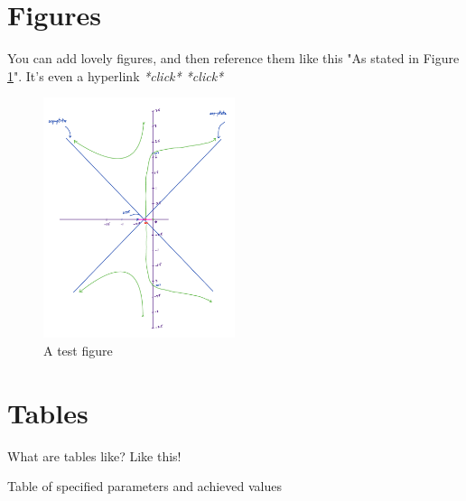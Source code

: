 \documentclass[hidelinks, 12pt]{article}%
\begin{document}
    \clearpage
    \section{Figures}
        You can add lovely figures, and then reference them like this "As stated in Figure \ref{fig:test}".
        It's even a hyperlink \textit{*click* *click*}

        \begin{figure}[H]
            \begin{centering}
                \includegraphics[width=0.5\textwidth]{images/rootLocus.png}
                \caption{A test figure}
                \label{fig:test}
            \end{centering}
        \end{figure}

    \section{Tables}
        What are tables like?
        Like this!
        \begin{table}[H]
            \centering
            \caption{Table of specified parameters and achieved values}
            \vspace{0.1cm}
            \label{Table:Parameters}
        \end{table}
\end{document}
